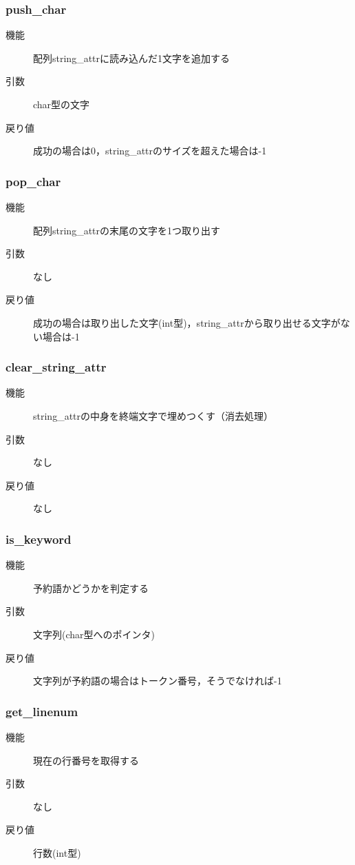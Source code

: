 \documentclass{jlreq}
\begin{document}
\subsubsection{push\_char}
\begin{description}
  \item[機能] 配列string\_attrに読み込んだ1文字を追加する
  \item[引数] char型の文字
  \item[戻り値] 成功の場合は0，string\_attrのサイズを超えた場合は-1
\end{description}

\subsubsection{pop\_char}
\begin{description}
  \item[機能] 配列string\_attrの末尾の文字を1つ取り出す
  \item[引数] なし
  \item[戻り値] 成功の場合は取り出した文字(int型)，string\_attrから取り出せる文字がない場合は-1
\end{description}

\subsubsection{clear\_string\_attr}
\begin{description}
  \item[機能] string\_attrの中身を終端文字で埋めつくす（消去処理）
  \item[引数] なし
  \item[戻り値] なし
\end{description}

\subsubsection{is\_keyword}
\begin{description}
  \item[機能] 予約語かどうかを判定する
  \item[引数] 文字列(char型へのポインタ)
  \item[戻り値] 文字列が予約語の場合はトークン番号，そうでなければ-1
\end{description}

\subsubsection{get\_linenum}
\begin{description}
  \item[機能] 現在の行番号を取得する
  \item[引数] なし
  \item[戻り値] 行数(int型)
\end{description}
\end{document}
